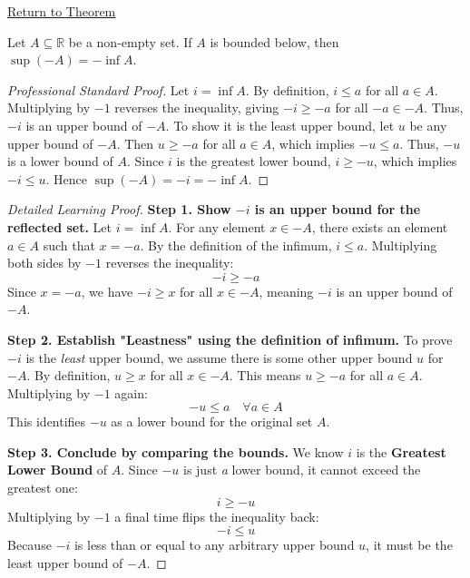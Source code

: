 \newpage
{}
\label{prf:negation-exchange-sup-inf}

\begin{remark*}[Return]
\hyperref[thm:negation-exchange-sup-inf]{Return to Theorem}
\end{remark*}

\begin{theorem*}
Let $A \subseteq \mathbb{R}$ be a non-empty set. If $A$ is bounded below, then $\sup(-A) = -\inf A$.
\end{theorem*}

\begin{proof}[Professional Standard Proof]
\LRAProofBodyStart
Let $i = \inf A$. By definition, $i \le a$ for all $a \in A$. Multiplying by $-1$ reverses the inequality, giving $-i \ge -a$ for all $-a \in -A$. Thus, $-i$ is an upper bound of $-A$. To show it is the least upper bound, let $u$ be any upper bound of $-A$. Then $u \ge -a$ for all $a \in A$, which implies $-u \le a$. Thus, $-u$ is a lower bound of $A$. Since $i$ is the greatest lower bound, $i \ge -u$, which implies $-i \le u$. Hence $\sup(-A) = -i = -\inf A$.
\end{proof}

\begin{proof}[Detailed Learning Proof]
\LRAProofBodyStart

\textbf{Step 1. Show $-i$ is an upper bound for the reflected set.}
Let $i = \inf A$. For any element $x \in -A$, there exists an element $a \in A$ such that $x = -a$. By the definition of the infimum, $i \le a$. Multiplying both sides by $-1$ reverses the inequality:
\[ -i \ge -a \]
Since $x = -a$, we have $-i \ge x$ for all $x \in -A$, meaning $-i$ is an upper bound of $-A$.

\textbf{Step 2. Establish "Leastness" using the definition of infimum.}
To prove $-i$ is the \textit{least} upper bound, we assume there is some other upper bound $u$ for $-A$. By definition, $u \ge x$ for all $x \in -A$. This means $u \ge -a$ for all $a \in A$.
Multiplying by $-1$ again:
\[ -u \le a \quad \forall a \in A \]
This identifies $-u$ as a lower bound for the original set $A$.

\textbf{Step 3. Conclude by comparing the bounds.}
We know $i$ is the \textbf{Greatest Lower Bound} of $A$. Since $-u$ is just \textit{a} lower bound, it cannot exceed the greatest one:
\[ i \ge -u \]
Multiplying by $-1$ a final time flips the inequality back:
\[ -i \le u \]
Because $-i$ is less than or equal to any arbitrary upper bound $u$, it must be the least upper bound of $-A$.
\end{proof}


